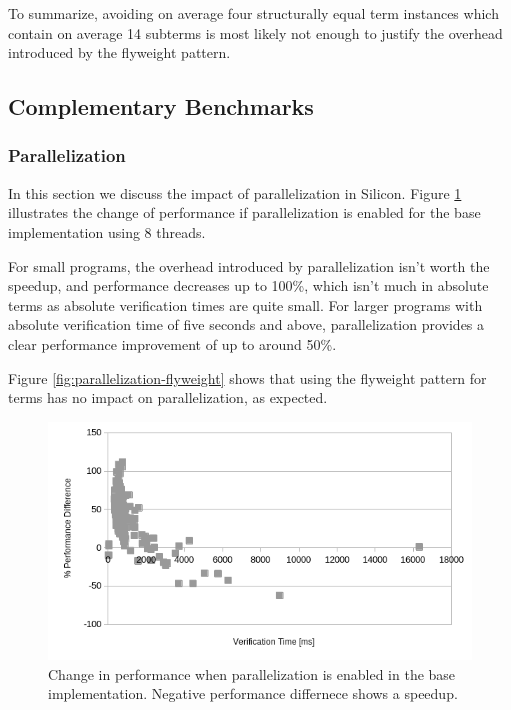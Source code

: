 \documentclass[11pt]{article}
\begin{document}
    To summarize, avoiding on average four structurally equal term instances which contain
    on average 14 subterms is most likely not enough to justify the overhead introduced by the flyweight pattern.



    \subsection{Complementary Benchmarks}

    \subsubsection{Parallelization}

    In this section we discuss the impact of
    parallelization in Silicon.
    Figure \ref{fig:parallelization} illustrates the change of performance
    if parallelization is enabled for the base implementation using 8 threads.

    For small programs, the overhead introduced by parallelization isn't worth
    the speedup, and performance decreases up to 100\%, which isn't much in absolute
    terms as absolute verification times are quite small. For larger programs
    with absolute verification time of five seconds and above, parallelization
    provides a clear performance improvement of up to around 50\%.

    Figure \ref{fig:parallelization-flyweight} shows that using the flyweight
    pattern for terms has no impact on parallelization, as expected.

    \begin{figure}[H]
        \includegraphics[width=\linewidth]{parallelization.png}
        \caption{Change in performance when parallelization is enabled in the base implementation. Negative performance differnece shows a speedup.}
        \label{fig:parallelization}
    \end{figure}
\end{document}
